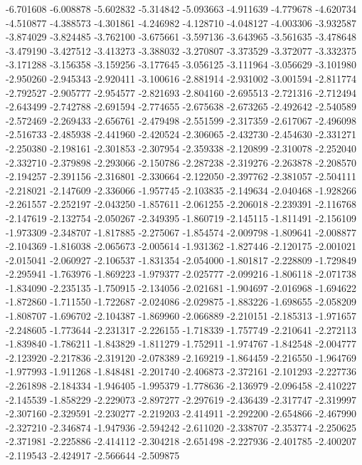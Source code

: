 -6.701608
-6.008878
-5.602832
-5.314842
-5.093663
-4.911639
-4.779678
-4.620734
-4.510877
-4.388573
-4.301861
-4.246982
-4.128710
-4.048127
-4.003306
-3.932587
-3.874029
-3.824485
-3.762100
-3.675661
-3.597136
-3.643965
-3.561635
-3.478648
-3.479190
-3.427512
-3.413273
-3.388032
-3.270807
-3.373529
-3.372077
-3.332375
-3.171288
-3.156358
-3.159256
-3.177645
-3.056125
-3.111964
-3.056629
-3.101980
-2.950260
-2.945343
-2.920411
-3.100616
-2.881914
-2.931002
-3.001594
-2.811774
-2.792527
-2.905777
-2.954577
-2.821693
-2.804160
-2.695513
-2.721316
-2.712494
-2.643499
-2.742788
-2.691594
-2.774655
-2.675638
-2.673265
-2.492642
-2.540589
-2.572469
-2.269433
-2.656761
-2.479498
-2.551599
-2.317359
-2.617067
-2.496098
-2.516733
-2.485938
-2.441960
-2.420524
-2.306065
-2.432730
-2.454630
-2.331271
-2.250380
-2.198161
-2.301853
-2.307954
-2.359338
-2.120899
-2.310078
-2.252040
-2.332710
-2.379898
-2.293066
-2.150786
-2.287238
-2.319276
-2.263878
-2.208570
-2.194257
-2.391156
-2.316801
-2.330664
-2.122050
-2.397762
-2.381057
-2.504111
-2.218021
-2.147609
-2.336066
-1.957745
-2.103835
-2.149634
-2.040468
-1.928266
-2.261557
-2.252197
-2.043250
-1.857611
-2.061255
-2.206018
-2.239391
-2.116768
-2.147619
-2.132754
-2.050267
-2.349395
-1.860719
-2.145115
-1.811491
-2.156109
-1.973309
-2.348707
-1.817885
-2.275067
-1.854574
-2.009798
-1.809641
-2.008877
-2.104369
-1.816038
-2.065673
-2.005614
-1.931362
-1.827446
-2.120175
-2.001021
-2.015041
-2.060927
-2.106537
-1.831354
-2.054000
-1.801817
-2.228809
-1.729849
-2.295941
-1.763976
-1.869223
-1.979377
-2.025777
-2.099216
-1.806118
-2.071738
-1.834090
-2.235135
-1.750915
-2.134056
-2.021681
-1.904697
-2.016968
-1.694622
-1.872860
-1.711550
-1.722687
-2.024086
-2.029875
-1.883226
-1.698655
-2.058209
-1.808707
-1.696702
-2.104387
-1.869960
-2.066889
-2.210151
-2.185313
-1.971657
-2.248605
-1.773644
-2.231317
-2.226155
-1.718339
-1.757749
-2.210641
-2.272113
-1.839840
-1.786211
-1.843829
-1.811279
-1.752911
-1.974767
-1.842548
-2.004777
-2.123920
-2.217836
-2.319120
-2.078389
-2.169219
-1.864459
-2.216550
-1.964769
-1.977993
-1.911268
-1.848481
-2.201740
-2.406873
-2.372161
-2.101293
-2.227736
-2.261898
-2.184334
-1.946405
-1.995379
-1.778636
-2.136979
-2.096458
-2.410227
-2.145539
-1.858229
-2.229073
-2.897277
-2.297619
-2.436439
-2.317747
-2.319997
-2.307160
-2.329591
-2.230277
-2.219203
-2.414911
-2.292200
-2.654866
-2.467990
-2.327210
-2.346874
-1.947936
-2.594242
-2.611020
-2.338707
-2.353774
-2.250625
-2.371981
-2.225886
-2.414112
-2.304218
-2.651498
-2.227936
-2.401785
-2.400207
-2.119543
-2.424917
-2.566644
-2.509875
